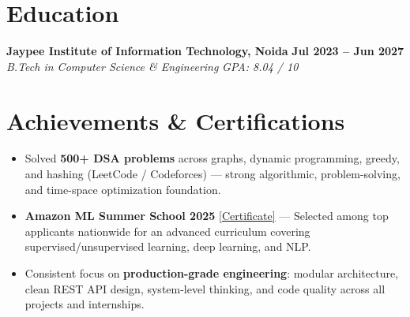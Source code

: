 \documentclass[a4paper,10.5pt]{article}
\newcommand{\resumeSubheading}[4]{%
  \noindent\textbf{\color{accent}#1} \hfill \textbf{\small#2} \\
  \noindent\textit{\small\color{gray}#3} \hfill \textit{\small\color{gray}#4} \vspace{2pt}%
}
\newcommand{\resumeItem}[1]{\item\small #1}
\begin{document}
\section*{Education}

\resumeSubheading
{Jaypee Institute of Information Technology, Noida}{Jul 2023 -- Jun 2027}
{B.Tech in Computer Science \& Engineering}{GPA: 8.04 / 10}

\section*{Achievements \& Certifications}

\begin{itemize}
  \resumeItem{Solved \textbf{500+ DSA problems} across graphs, dynamic programming, greedy, and hashing (LeetCode / Codeforces) --- strong algorithmic, problem-solving, and time-space optimization foundation.}
  \resumeItem{\textbf{Amazon ML Summer School 2025} \href{https://drive.google.com/file/d/1T9mSpv0DFmDpvxUingbAiahDqWr-zmf4/view?usp=sharing}{\small[Certificate]} --- Selected among top applicants nationwide for an advanced curriculum covering supervised/unsupervised learning, deep learning, and NLP.}
  \resumeItem{Consistent focus on \textbf{production-grade engineering}: modular architecture, clean REST API design, system-level thinking, and code quality across all projects and internships.}
\end{itemize}
\end{document}
